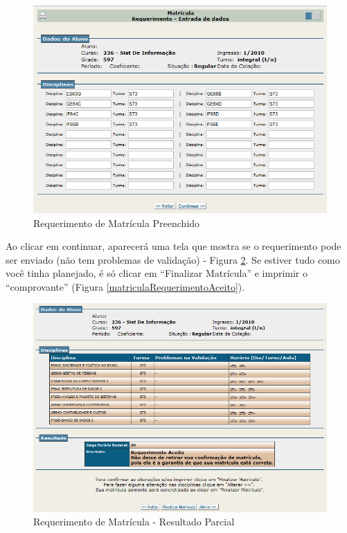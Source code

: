 \documentclass[a4paper,12pt,openany]{article}
\begin{document}
	\begin{figure}[ht!]  \centering
		\includegraphics[scale=0.8]{Matricula_Requerimento_Preenchido.png}
		\caption{Requerimento de Matrícula Preenchido}
		\label{matriculaRequerimentoPreenchido}
	\end{figure}

Ao clicar em continuar, aparecerá uma tela que mostra se o requerimento pode ser enviado (não tem problemas de validação) - Figura \ref{matriculaRequerimentoResultadoParcial}. Se estiver tudo como você tinha planejado, é só clicar em ``Finalizar Matrícula'' e imprimir o ``comprovante'' (Figura \ref{matriculaRequerimentoAceito}).

	\begin{figure}[ht!]  \centering
		\includegraphics[scale=0.75]{Matricula_Requerimento_Resultado_Parcial.png}
		\caption{Requerimento de Matrícula - Resultado Parcial}
		\label{matriculaRequerimentoResultadoParcial}
	\end{figure}
\end{document}
